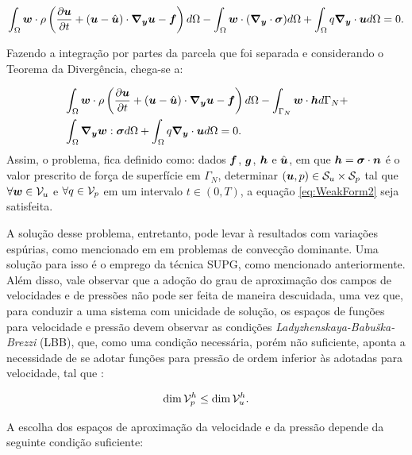 \begin{equation}
    \int_{\Omega}{\boldsymbol{w}\cdot\rho\left({\frac{\partial{\boldsymbol{u}}}{\partial t}+(\boldsymbol{u}-\hat{\boldsymbol{u}})\cdot\boldsymbol{\nabla_y}\boldsymbol{u}-\boldsymbol{f}}\right) d\Omega}-\int_{\Omega}{\boldsymbol{w}\cdot(\boldsymbol{\nabla_y}\cdot\boldsymbol{\sigma}) d\Omega}+\int_{\Omega}{q\boldsymbol{\nabla_y}\cdot\boldsymbol{u} d\Omega}=0\text{.}
    \label{eq:WeakForm1}
\end{equation}

Fazendo a integração por partes da parcela que foi separada e considerando o Teorema da Divergência, chega-se a:

\begin{equation}
    \begin{split}
        &\int_{\Omega}{\boldsymbol{w}\cdot\rho\left({\frac{\partial{\boldsymbol{u}}}{\partial t}+(\boldsymbol{u}-\hat{\boldsymbol{u}})\cdot\boldsymbol{\nabla_y}\boldsymbol{u}-\boldsymbol{f}}\right) d\Omega}-\int_{\Gamma_N}{\boldsymbol{w}\cdot\boldsymbol{h} d\Gamma_N}+\\
        &\int_{\Omega}{\boldsymbol{\nabla_y}\boldsymbol{w}:\boldsymbol{\sigma} d\Omega}+\int_{\Omega}{q\boldsymbol{\nabla_y}\cdot\boldsymbol{u} d\Omega}=0\text{.}
    \end{split}
    \label{eq:WeakForm2}
\end{equation}
Assim, o problema, fica definido como: dados $\boldsymbol{f}$, $\boldsymbol{g}$, $\boldsymbol{h}$ e $\hat{\boldsymbol{u}}$, em que $\boldsymbol{h}=\boldsymbol{\sigma}\cdot\boldsymbol{n}$ é o valor prescrito de força de superfície em $\Gamma_N$, determinar $(\boldsymbol{u},p)\in\mathcal{S}_u\times\mathcal{S}_p$ tal que $\forall\boldsymbol{w}\in\mathcal{V}_u$ e $\forall q\in\mathcal{V}_p$ em um intervalo $t\in(0,T)$, a equação \eqref{eq:WeakForm2} seja satisfeita.

A solução desse problema, entretanto, pode levar à resultados com variações espúrias, como mencionado em \cite{fernandes2020tecnica,donea2003finite,brooks1982streamline} em problemas de convecção dominante. Uma solução para isso é o emprego da técnica SUPG, como mencionado anteriormente. Além disso, vale observar que a adoção do grau de aproximação dos campos de velocidades e de pressões não pode ser feita de maneira descuidada, uma vez que, para conduzir a uma sistema com unicidade de solução, os espaços de funções para velocidade e pressão devem observar as condições \textit{Ladyzhenskaya-Babuška-Brezzi} (LBB), que, como uma condição necessária, porém não suficiente, aponta a necessidade de se adotar funções para pressão de ordem inferior às adotadas para velocidade, tal que \cite{donea2003finite}:

\begin{equation}
    \dim{\mathcal{V}_p^h}\leq\dim{\mathcal{V}_u^h}\text{.}
\end{equation}

A escolha dos espaços de aproximação da velocidade e da pressão depende da seguinte condição suficiente:

